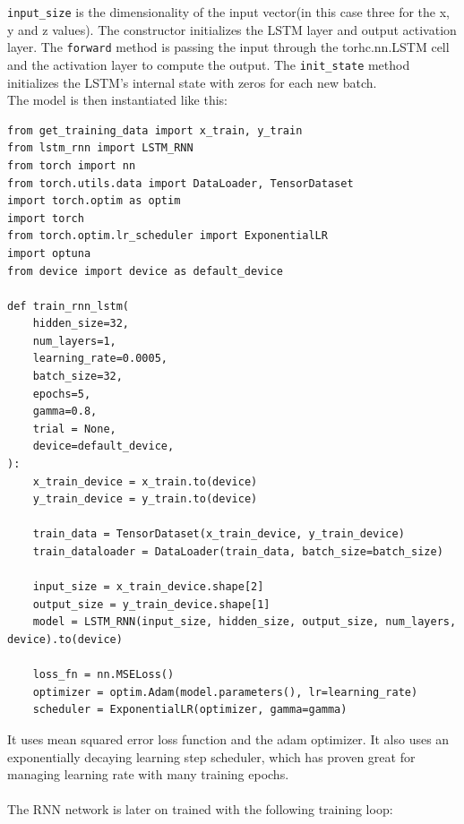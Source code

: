 \documentclass[11pt]{article}
\begin{document}
\texttt{input\_size} is the dimensionality of the input vector(in this case three for the x, y and z values). The constructor initializes the LSTM layer and output activation layer. The \texttt{forward} method is passing the input through the torhc.nn.LSTM cell and the activation layer to compute the output. The \texttt{init\_state} method initializes the LSTM's internal state with zeros for each new batch. \\

The model is then instantiated like this:
\begin{lstlisting}
from get_training_data import x_train, y_train
from lstm_rnn import LSTM_RNN
from torch import nn
from torch.utils.data import DataLoader, TensorDataset
import torch.optim as optim
import torch
from torch.optim.lr_scheduler import ExponentialLR
import optuna
from device import device as default_device

def train_rnn_lstm(
    hidden_size=32,
    num_layers=1,
    learning_rate=0.0005,
    batch_size=32,
    epochs=5,
    gamma=0.8,
    trial = None,
    device=default_device,
):
    x_train_device = x_train.to(device)
    y_train_device = y_train.to(device)

    train_data = TensorDataset(x_train_device, y_train_device)
    train_dataloader = DataLoader(train_data, batch_size=batch_size)

    input_size = x_train_device.shape[2]
    output_size = y_train_device.shape[1]
    model = LSTM_RNN(input_size, hidden_size, output_size, num_layers, device).to(device)

    loss_fn = nn.MSELoss()
    optimizer = optim.Adam(model.parameters(), lr=learning_rate)
    scheduler = ExponentialLR(optimizer, gamma=gamma)
\end{lstlisting}

 It uses mean squared error loss function and the adam optimizer. It also uses an exponentially decaying learning step scheduler, which has proven great for managing learning rate with many training epochs. \\ \\  The RNN network is later on trained with the following training loop:
\end{document}
